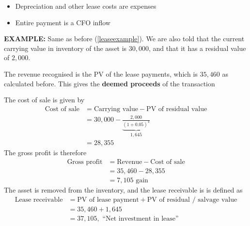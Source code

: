 \documentclass[../notes_compiled.tex]{subfiles}
\begin{document}
\begin{itemize}
\begin{itemize}
\item Depreciation and other lease costs are expenses
\item Entire payment is a CFO inflow
\end{itemize}
{\color{RedViolet}
\item[] \textbf{EXAMPLE:} Same as before (\ref{leaseexample}). We are also told that the current carrying value in inventory of the asset is $30,000$, and that it has a residual value of $2,000$.
}
{\color{RoyalBlue}
\item The revenue recognised is the PV of the lease payments, which is $35,460$ as calculated before. This gives the \textbf{deemed proceeds} of the transaction
\item The cost of sale is given by
\begin{align*}
\text{Cost of sale} &= \text{Carrying value} - \text{PV of residual value} \\
&= 30,000 - \underbrace{\frac{2,000}{(1+0.05)^{4}}}_{1,645} \\
&=28,355
\end{align*}
The gross profit is therefore
\begin{align*}
\text{Gross profit} &= \text{Revenue} - \text{Cost of sale} \\
&=35,460 - 28,355 \\
&= 7,105 \text{ gain}
\end{align*}
The asset is removed from the inventory, and the lease receivable is is defined as
\begin{align*}
\text{Lease receivable} &= \text{PV of lease payment} + \text{PV of residual / salvage value} \\
&=35,460 + 1,645 \\
&=37,105, \text{ ``Net investment in lease''}
\end{align*}

}
\end{itemize}
\end{document}
